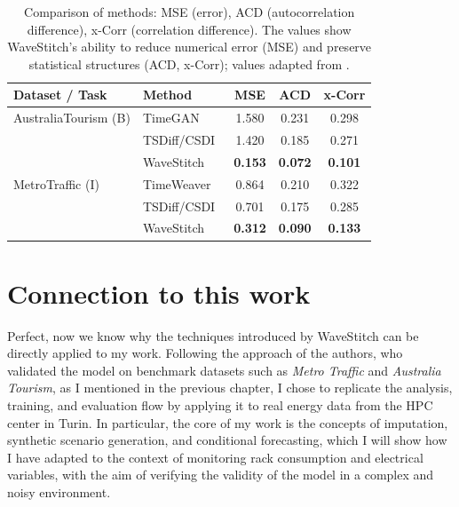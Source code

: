\begin{table}[H]
\centering
\setlength{\tabcolsep}{10pt}
\renewcommand{\arraystretch}{1.15}
\begin{tabular}{| l | l | c | c | c |}
\hline
\rowcolor[HTML]{F87C58}
\textbf{Dataset / Task} & \textbf{Method} & \textbf{MSE} & \textbf{ACD} & \textbf{x-Corr} \\
\hline
AustraliaTourism (B) & TimeGAN~\cite{yoon2019timegan}    & 1.580 & 0.231 & 0.298 \\ \hline
                     & TSDiff/CSDI~\cite{tashiro2021csdi} & 1.420 & 0.185 & 0.271 \\ \hline
\rowcolor[HTML]{FDE5DC}
                     & WaveStitch~\cite{wavestitch}       & \textbf{0.153} & \textbf{0.072} & \textbf{0.101} \\ \hline
MetroTraffic (I)     & TimeWeaver~\cite{zhou2023timeweaver} & 0.864 & 0.210 & 0.322 \\ \hline
                     & TSDiff/CSDI~\cite{tashiro2021csdi}   & 0.701 & 0.175 & 0.285 \\ \hline
\rowcolor[HTML]{FDE5DC}
                     & WaveStitch~\cite{wavestitch}          & \textbf{0.312} & \textbf{0.090} & \textbf{0.133} \\ \hline
\end{tabular}
\caption{Comparison of methods: MSE (error), ACD (autocorrelation difference), x-Corr (correlation difference).  
The values show WaveStitch’s ability to reduce numerical error (MSE) and preserve statistical structures (ACD, x-Corr); values adapted from \cite{wavestitch}.}
\label{tab:wave-results}
\end{table}

\section{Connection to this work}

Perfect, now we know why the techniques introduced by WaveStitch can be directly applied to my work.  
Following the approach of the authors, who validated the model on benchmark datasets such as \emph{Metro Traffic} and \emph{Australia Tourism}, as I mentioned in the previous chapter, I chose to replicate the analysis, training, and evaluation flow by applying it to real energy data from the HPC center in Turin.  
In particular, the core of my work is the concepts of imputation, synthetic scenario generation, and conditional forecasting, which I will show how I have adapted to the context of monitoring rack consumption and electrical variables, with the aim of verifying the validity of the model in a complex and noisy environment.